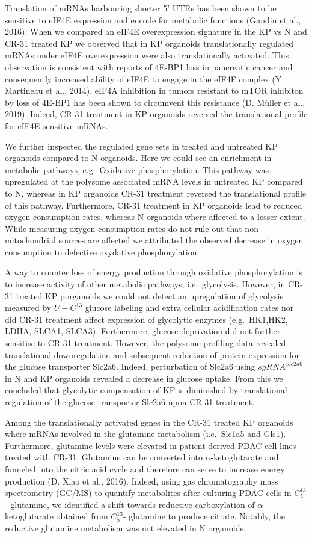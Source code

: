 \documentclass[12pt,openany]{book}
\begin{document}
Translation of mRNAs harbouring shorter 5' UTRs has been shown to be
sensitive to eIF4E expression and encode for metabolic functions (Gandin
et al., 2016). When we compared an eIF4E overexpression signature in the
KP vs N and CR-31 treated KP we observed that in KP organoids
translationally regulated mRNAs under eIF4E overexpression were also
translationally activated. This observation is consistent with reports
of 4E-BP1 loss in pancreatic cancer and consequently increased ability
of eIF4E to engage in the eIF4F complex (Y. Martineau et al., 2014).
eIF4A inhibition in tumors resistant to mTOR inhibiton by loss of 4E-BP1
has been shown to circumvent this resistance (D. Müller et al., 2019).
Indeed, CR-31 treatment in KP organoids reversed the translational
profile for eIF4E sensitive mRNAs.

We further inspected the regulated gene sets in treated and untreated KP
organoids compared to N organoids. Here we could see an enrichment in
metabolic pathways, e.g.~Oxidative phosphorylation. This pathway was
upregulated at the polysome associated mRNA levels in untreated KP
compared to N, whereas in KP organoids CR-31 treatment reversed the
translational profile of this pathway. Furthermore, CR-31 treatment in
KP organoids lead to reduced oxygen consumption rates, whereas N
organoids where affected to a lesser extent. While measuring oxygen
consumption rates do not rule out that non-mitochondrial sources are
affected we attributed the observed decrease in oxygen consumption to
defective oxydative phosphorylation.

A way to counter loss of energy production through oxidative
phosphorylation is to increase activity of other metabolic pathways,
i.e.~glycolysis. However, in CR-31 treated KP porganoids we could not
detect an upregulation of glycolysis measured by \(U-C^{13}\) glucose
labeling and extra cellular acidification rates nor did CR-31 treatment
affect expression of glycolytic enzymes (e.g.~HK1,HK2, LDHA, SLCA1,
SLCA3). Furthermore, glucose deprivation did not further sensitise to
CR-31 treatment. However, the polysome profiling data revealed
translational downregulation and subsequent reduction of protein
expression for the glucose transporter Slc2a6. Indeed, perturbation of
Slc2a6 using \(sgRNA^{Slc2a6}\) in N and KP organoids revealed a
decrease in glucose uptake. From this we concluded that glycolytic
compensation of KP is diminished by translational regulation of the
glucose transporter Slc2a6 upon CR-31 treatment.

Among the translationally activated genes in the CR-31 treated KP
organoids where mRNAs involved in the glutamine metabolism (i.e.~Slc1a5
and Gls1). Furthermore, glutamine levels were elevated in patient
derived PDAC cell lines treated with CR-31. Glutamine can be converted
into \(\alpha\)-ketoglutarate and funneled into the citric acid cycle
and therefore can serve to increase energy production (D. Xiao et al.,
2016). Indeed, using gas chromatography mass spectrometry (GC/MS) to
quantify metabolites after culturing PDAC cells in \(C_5^{13}\)-
glutamine, we identified a shift towards reductive carboxylation of
\(\alpha\)-ketoglutarate obtained from \(C_5^{13}\)- glutamine to
produce citrate. Notably, the reductive glutamine metabolism was not
elevated in N organoids.
\end{document}

